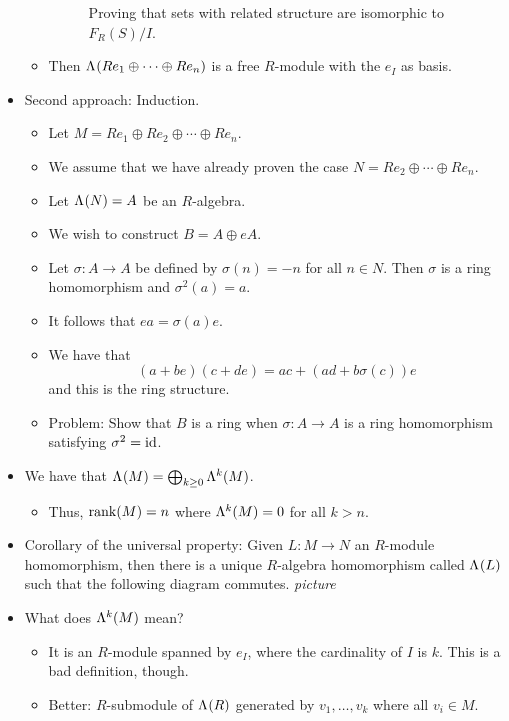 \documentclass[../notes.tex]{subfiles}
\begin{document}
\begin{itemize}
\begin{itemize}
\begin{figure}[h!]
            \caption{Proving that sets with related structure are isomorphic to $F_R(S)/I$.}
            \label{fig:FRSrelated}
        \end{figure}
        \item Then $\lam{Re_1\oplus\cdots\oplus Re_n}$ is a free $R$-module with the $e_I$ as basis.
    \end{itemize}
    \item Second approach: Induction.
    \begin{itemize}
        \item Let $M=Re_1\oplus Re_2\oplus\cdots\oplus Re_n$.
        \item We assume that we have already proven the case $N=Re_2\oplus\cdots\oplus Re_n$.
        \item Let $\lam{N}=A$ be an $R$-algebra.
        \item We wish to construct $B=A\oplus eA$.
        \item Let $\sigma:A\to A$ be defined by $\sigma(n)=-n$ for all $n\in N$. Then $\sigma$ is a ring homomorphism and $\sigma^2(a)=a$.
        \item It follows that $ea=\sigma(a)e$.
        \item We have that
        \begin{equation*}
            (a+be)(c+de) = ac+(ad+b\sigma(c))e
        \end{equation*}
        and this is the ring structure.
        \item Problem: Show that $B$ is a ring when $\sigma:A\to A$ is a ring homomorphism satisfying $\sigma^2=\id$.
    \end{itemize}
    \item We have that $\lam{M}=\bigoplus_{k\geq 0}\lam[k]{M}$.
    \begin{itemize}
        \item Thus, $\rank(M)=n$ where $\lam[k]{M}=0$ for all $k>n$.
    \end{itemize}
    \item Corollary of the universal property: Given $L:M\to N$ an $R$-module homomorphism, then there is a unique $R$-algebra homomorphism called $\lam{L}$ such that the following diagram commutes.
    \emph{picture}
    \item What does $\lam[k]{M}$ mean?
    \begin{itemize}
        \item It is an $R$-module spanned by $e_I$, where the cardinality of $I$ is $k$. This is a bad definition, though.
        \item Better: $R$-submodule of $\lam{R}$ generated by $v_1,\dots,v_k$ where all $v_i\in M$.

\end{itemize}
\end{itemize}
\end{document}
